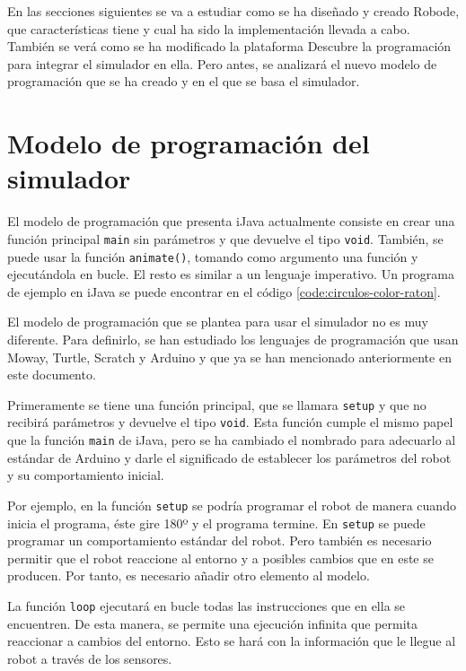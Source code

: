 En las secciones siguientes se va a estudiar como se ha diseñado y creado Robode, que características tiene y cual ha sido la implementación llevada a cabo. También se verá como se ha modificado la plataforma Descubre la programación para integrar el simulador en ella. Pero antes, se analizará el nuevo modelo de programación que se ha creado y en el que se basa el simulador.



\section{Modelo de programación del simulador}
\label{sec:modelo-programacion}

El modelo de programación que presenta iJava actualmente consiste en crear una función principal \texttt{main} sin parámetros y que devuelve el tipo \texttt{void}. También, se puede usar la función \texttt{animate()}, tomando como argumento una función y ejecutándola en bucle. El resto es similar a un lenguaje imperativo. Un programa de ejemplo en iJava se puede encontrar en el código \ref{code:circulos-color-raton}.

El modelo de programación que se plantea para usar el simulador no es muy diferente. Para definirlo, se han estudiado los lenguajes de programación que usan Moway, Turtle, Scratch y Arduino y que ya se han mencionado anteriormente en este documento.


Primeramente se tiene una función principal, que se llamara \texttt{setup} y que no recibirá parámetros y devuelve el tipo \texttt{void}. Esta función cumple el mismo papel que la función \texttt{main} de iJava, pero se ha cambiado el nombrado para adecuarlo al estándar de Arduino y darle el significado de establecer los parámetros del robot y su comportamiento inicial. 

Por ejemplo, en la función \texttt{setup} se podría programar el robot de manera cuando inicia el programa, éste gire 180º y el programa termine. En \texttt{setup} se puede programar un comportamiento estándar del robot. Pero también es necesario permitir que el robot reaccione al entorno y a posibles cambios que en este se producen. Por tanto, es necesario añadir otro elemento al modelo.

La función \texttt{loop} ejecutará en bucle todas las instrucciones que en ella se encuentren. De esta manera, se permite una ejecución infinita que permita reaccionar a cambios del entorno. Esto se hará con la información que le llegue al robot a través de los sensores. 


